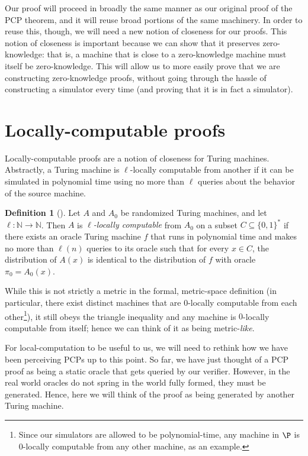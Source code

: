 \documentclass[english,12pt]{reedthesis}
\theoremstyle{plain}
\theoremstyle{definition}
\newtheorem{defn}[defn]{Definition}
\theoremstyle{remark}
\begin{document}
Our proof will proceed in broadly the same manner as our original proof of the
PCP theorem, and it will reuse broad portions of the same machinery. In order to
reuse this, though, we will need a new notion of closeness for our proofs. This
notion of closeness is important because we can show that it preserves
zero-knowledge: that is, a machine that is close to a zero-knowledge machine
must itself be zero-knowledge. This will allow us to more easily prove that we
are constructing zero-knowledge proofs, without going through the hassle of
constructing a simulator every time (and proving that it is in fact a
simulator).

\section{Locally-computable proofs}\label{sec:loc-comp-proof}

Locally-computable proofs are a notion of closeness for Turing machines.
Abstractly, a Turing machine is $\ell$-locally computable from another if it can be
simulated in polynomial time using no more than $\ell$ queries about the behavior
of the source machine.

\begin{defn}[{\cite[Def.\ 3.1]{GOS25}}]\label{def:loc-comp}%
   Let $A$ and $A_{0}$ be randomized Turing
  machines, and let $\ell\colon \mathbb{N} \rightarrow \mathbb{N}$. Then $A$ is \emph{$\ell$-locally computable}
  from $A_{0}$ on a subset $C \subseteq \{0, 1\}^{*}$ if there exists an oracle Turing
  machine $f$ that runs in polynomial time and makes no more than $\ell(n)$ queries
  to its oracle such that for every $x \in C$, the distribution of $A(x)$ is
  identical to the distribution of $f$ with oracle $\pi_{0} = A_{0}(x)$.
\end{defn}

While this is not strictly a metric in the formal, metric-space definition (in
particular, there exist distinct machines that are $0$-locally computable from
each other\footnote{Since our simulators are allowed to be polynomial-time, any
  machine in $\P$ is $0$-locally computable from any other machine, as an
  example.}), it still obeys the triangle inequality and any machine is
$0$-locally computable from itself; hence we can think of it as being
metric-\emph{like}.

For local-computation to be useful to us, we will need to rethink how we have
been perceiving PCPs up to this point. So far, we have just thought of a PCP
proof as being a static oracle that gets queried by our verifier. However, in
the real world oracles do not spring in the world fully formed, they must be
generated. Hence, here we will think of the proof as being generated by another
Turing machine.
\end{document}
